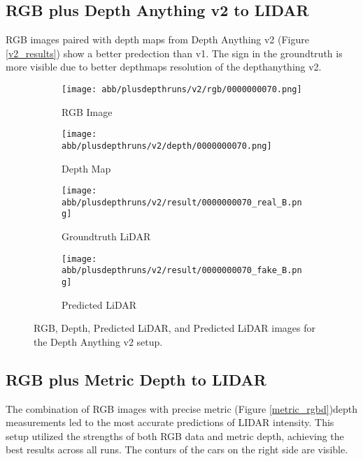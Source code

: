 \subsection{RGB plus Depth Anything v2 to LIDAR}
RGB images paired with depth maps from Depth Anything v2 (Figure \ref{v2_results}) show a better predection than v1. The sign in the groundtruth is more visible due to better depthmaps resolution of the depthanything v2.
\begin{figure}[!ht]
	\centering
	\begin{subfigure}{0.4\textwidth}
		\centering
		\texttt{[image: abb/plusdepthruns/v2/rgb/0000000070.png]}
		\caption{RGB Image}
		\label{fig:v2_rgb}
	\end{subfigure}
	
	\vspace{1em} %
	
	\begin{subfigure}{0.4\textwidth}
		\centering
		\texttt{[image: abb/plusdepthruns/v2/depth/0000000070.png]}
		\caption{Depth Map}
		\label{fig:v2_depth}
	\end{subfigure}
	
	\vspace{1em} %
	
	\begin{subfigure}{0.25\textwidth}
		\centering
		\texttt{[image: abb/plusdepthruns/v2/result/0000000070\_real\_B.png]}
		\caption{Groundtruth LiDAR}
		\label{fig:v2_pred_lidar}
	\end{subfigure}
	\begin{subfigure}{0.25\textwidth}
		\centering
		\texttt{[image: abb/plusdepthruns/v2/result/0000000070\_fake\_B.png]}
		\caption{Predicted LiDAR}
		\label{v2}
	\end{subfigure}
	
	\caption{RGB, Depth, Predicted LiDAR, and Predicted LiDAR images for the Depth Anything v2 setup.}
	\label{v2_rgbd}
\end{figure}
\subsection{RGB plus Metric Depth to LIDAR}

The combination of RGB images with precise metric (Figure \ref{metric_rgbd})depth measurements led to the most accurate predictions of LIDAR intensity. This setup utilized the strengths of both RGB data and metric depth, achieving the best results across all runs. The conturs of the cars on the right side are visible. 

